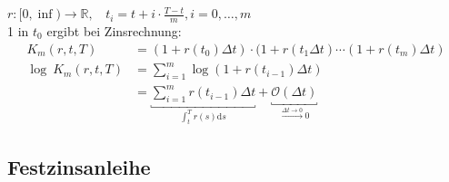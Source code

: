 \begin{enumerate}[(a)]
	\\
	$r:[0,\inf) \to \mathds{R},~~~~t_i= t+i\cdot \frac{T-t}{m}, i=0,\dots,m$\\
	1 \texteuro in $t_0$ ergibt bei Zinsrechnung:\\
	\begin{equation*}
	\begin{aligned}
		K_m(r,t,T) &= (1+r(t_0)\Delta t)\cdot(1+r(t_1\Delta t)\cdots(1+r(t_m)\Delta t) \\
		\log~K_m(r,t,T) &= \sum_{i=1}^{m}\log(1+r(t_{i-1})\Delta t) \\
		&= \underbracket{\sum_{i=1}^{m}r(t_{i-1})\Delta t}_{\int_{t}^{T}r(s)\mathrm{d}s} +\underbracket{\mathcal{O}(\Delta t)}_{\stackrel{\Delta t \to 0}{\longrightarrow} 0}
	\end{aligned}
	\end{equation*}
\end{enumerate}

\subsection{Festzinsanleihe}
\label{sub:festzinsanleihe}

